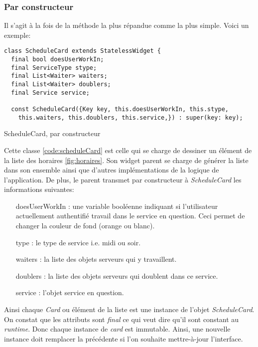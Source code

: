 \subsubsection{Par constructeur}
Il s'agit à la fois de la méthode la plus répandue comme la plus simple. Voici un exemple:

\begin{listing}[h]
    \begin{verbatim}
class ScheduleCard extends StatelessWidget {
  final bool doesUserWorkIn;
  final ServiceType stype;
  final List<Waiter> waiters;
  final List<Waiter> doublers;
  final Service service;
  
  const ScheduleCard({Key key, this.doesUserWorkIn, this.stype,
    this.waiters, this.doublers, this.service,}) : super(key: key);
    \end{verbatim}
    \caption{ScheduleCard, par constructeur}
    \label{code:scheduleCard}
\end{listing}
Cette classe \autoref{code:scheduleCard} est celle qui se charge de dessiner un élément de la liste des horaires \autoref{fig:horaires}. Son widget parent se charge de générer la liste dans son ensemble ainsi que d'autres implémentations de la logique de l'application. De plus, le parent transmet par constructeur à \textit{ScheduleCard} les informations suivantes:
\smallskip
\begin{itemize}
    \item [doesUserWorkIn] : une variable booléenne indiquant si l'utilisateur actuellement authentifié travail dans le service en question. Ceci permet de changer la couleur de fond (orange ou blanc).
    \item [type] : le type de service i.e. midi ou soir.
    \item [waiters]: la liste des objets serveurs qui y travaillent.
    \item [doublers]: la liste des objets serveurs qui doublent dans ce service.
    \item [service]: l'objet service en question.
\end{itemize}
\smallskip

Ainsi chaque \textit{Card} ou élément de la liste est une instance de l'objet \textit{ScheduleCard}. On constat que les attributs sont \textit{final} ce qui veut dire qu'il sont constant au \textit{runtime}. Donc chaque instance de \textit{card} est immutable. Ainsi, une nouvelle instance doit remplacer la précédente si l'on souhaite mettre-à-jour l'interface. 

